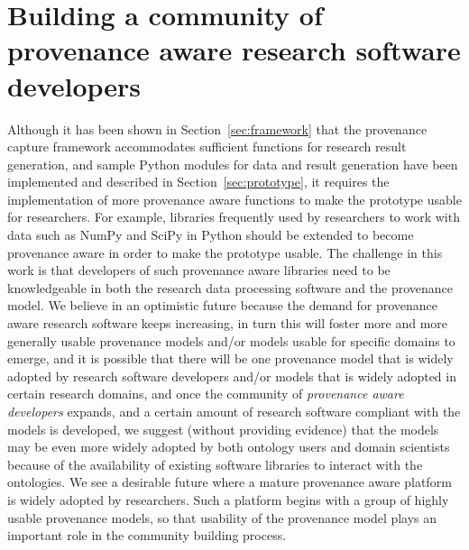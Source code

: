 \section{Building a community of provenance aware research software developers}
Although it has been shown in Section~\ref{sec:framework} that the provenance capture framework accommodates sufficient functions for research result generation, and sample Python modules for data and result generation have been implemented and described in Section~\ref{sec:prototype}, it requires the implementation of more provenance aware functions to make the prototype usable for researchers. For example, libraries frequently used by researchers to work with data such as NumPy and SciPy in Python should be extended to become provenance aware in order to make the prototype usable. The challenge in this work is that developers of such provenance aware libraries need to be knowledgeable in both the research data processing software and the provenance model. We believe in an optimistic future because the demand for provenance aware research software keeps increasing, in turn this will foster more and more generally usable provenance models and/or models usable for specific domains to emerge, and it is possible that there will be one provenance model that is widely adopted by research software developers and/or models that is widely adopted in certain research domains, and once the community of \emph{provenance aware developers} expands, and a certain amount of research software compliant with the models is developed, we suggest (without providing evidence) that the models may be even more widely adopted by both ontology users and domain scientists because of the availability of existing software libraries to interact with the ontologies. We see a desirable future where a mature provenance aware platform is widely adopted by researchers. Such a platform begins with a group of highly usable provenance models, so that usability of the provenance model plays an important role in the community building process.

